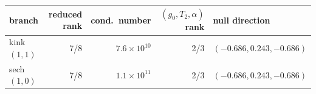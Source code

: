\begin{tabular}{lrrrl}
\toprule
branch & reduced rank & cond.\ number & $(g_0,T_2,\alpha)$ rank & null direction \\
\midrule
kink $(1,1)$ & 7/8 & $7.6\times10^{10}$ & 2/3 & $(-0.686, 0.243, -0.686)$ \\
sech $(1,0)$ & 7/8 & $1.1\times10^{11}$ & 2/3 & $(-0.686, 0.243, -0.686)$ \\
\bottomrule
\end{tabular}